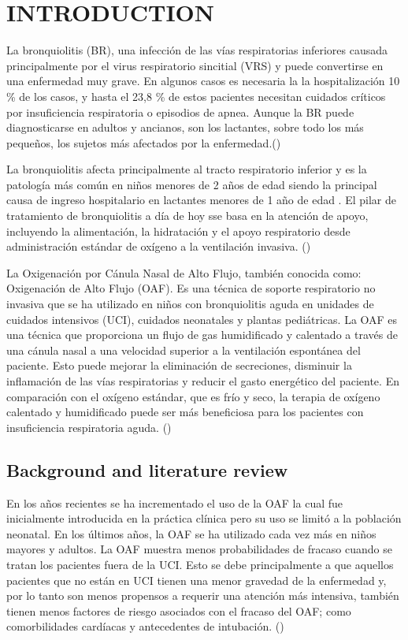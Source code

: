 \section{INTRODUCTION} \label{sec:itroduction}

La bronquiolitis (BR), una infección de las vías respiratorias inferiores causada principalmente por el virus respiratorio sincitial (VRS) y puede convertirse en una enfermedad muy grave. En algunos casos es necesaria la la hospitalización
10 \% de los casos, y hasta el 23,8 \% de estos pacientes necesitan cuidados críticos por insuficiencia respiratoria o episodios de apnea. Aunque la BR puede diagnosticarse en adultos y ancianos, son los lactantes, sobre todo los más pequeños, los sujetos más afectados por la enfermedad.(\cite{Fainardi2021}) 

La bronquiolitis afecta principalmente al tracto respiratorio inferior y es la patología más común en niños menores de 2 años de edad siendo la principal causa de ingreso hospitalario en lactantes menores de 1 año de edad . El pilar de tratamiento de bronquiolitis a día de hoy sse basa en la atención de apoyo, incluyendo la alimentación, la hidratación y el apoyo respiratorio desde administración estándar de oxígeno a la ventilación invasiva. (\cite{Daverio2019})

La Oxigenación por Cánula Nasal de Alto Flujo, también conocida como: Oxigenación de Alto Flujo (OAF). Es una técnica de soporte respiratorio no invasiva que se ha utilizado en niños con bronquiolitis aguda en unidades de cuidados intensivos (UCI), cuidados neonatales y plantas pediátricas. La OAF es una técnica que proporciona un flujo de gas humidificado y calentado a través de una cánula nasal a una velocidad superior a la ventilación espontánea del paciente. Esto puede mejorar la eliminación de secreciones, disminuir la inflamación de las vías respiratorias y reducir el gasto energético del paciente. En comparación con el oxígeno estándar, que es frío y seco, la terapia de oxígeno calentado y humidificado puede ser más beneficiosa para los pacientes con insuficiencia respiratoria aguda. (\cite{Daverio2019})


\subsection{Background and literature review}

En los años recientes se ha incrementado el uso de la OAF la cual fue inicialmente introducida en la práctica clínica pero su uso se limitó a la población neonatal. En los últimos años, la OAF se ha utilizado cada vez más en niños mayores y adultos. La OAF muestra menos probabilidades de fracaso cuando se tratan los pacientes fuera de la UCI. Esto se debe principalmente a que aquellos pacientes que no están en UCI tienen una menor gravedad de la enfermedad y, por lo tanto son menos propensos a requerir una atención más intensiva, también tienen menos factores de riesgo asociados con el fracaso del OAF; como comorbilidades cardíacas y antecedentes de intubación. (\cite{Betters2017}) 

